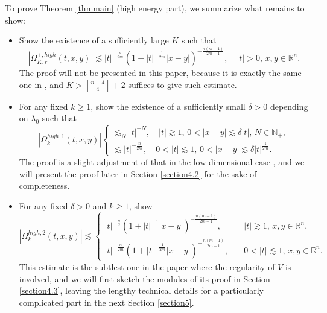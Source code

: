 \documentclass[11pt,reqno]{amsart}
\numberwithin{equation}{section}
\theoremstyle{definition}
\begin{document}
To prove Theorem \ref{thmmain} (high energy part), we summarize what remains to show:

\begin{itemize}
	\item[(\romannumeral1)] Show the existence of a sufficiently large $K$ such that
	\begin{equation*}\label{estOmegaK}
		|\Omega_{K,r}^{\pm,high}(t,x,y)|\lesssim|t|^{-\frac{n}{2m}}(1+|t|^{-\frac{1}{2m}}|x-y|)^{-\frac{n(m-1)}{2m-1}},\quad|t|>0,\,x,y\in\mathbb{R}^n.
	\end{equation*}
	The proof will not be presented in this paper, because it is exactly the same one in \cite{CHHZ}, and $K>[\frac{n-4}{4}]+2$ suffices to give such estimate.
	
	\item[(\romannumeral2)] For any fixed $k\geq1$, show the existence of a sufficiently small $\delta>0$ depending on $\lambda_0$ such that
	\begin{equation}\label{Omegahigh1}
		|\Omega_k^{high,1}(t,x,y)|\begin{cases}
			\lesssim_N|t|^{-N},\quad|t|\gtrsim1,\,0<|x-y|\lesssim\delta|t|,\,N\in\mathbb{N}_+,\\
			\lesssim|t|^{-\frac{n}{2m}},\quad0<|t|\lesssim1,\,0<|x-y|\lesssim\delta|t|^\frac{1}{2m}.
		\end{cases}
	\end{equation}
	The proof is a slight adjustment of that in the low dimensional case \cite{CHHZ}, and we will present the proof later in Section \ref{section4.2} for the sake of completeness. 

	\item[(\romannumeral3)] For any fixed $\delta>0$ and $k\geq1$, show
	\begin{equation}\label{Ogema2bound}
		|\Omega_k^{high,2}(t,x,y)|\lesssim\begin{cases}
			|t|^{-\frac{n}{2}}(1+|t|^{-1}|x-y|)^{-\frac{n(m-1)}{2m-1}},\quad&|t|\gtrsim1,\,x,y\in\mathbb{R}^n,\\
			|t|^{-\frac{n}{2m}}(1+|t|^{-\frac{1}{2m}}|x-y|)^{-\frac{n(m-1)}{2m-1}},\quad&0<|t|\lesssim1,\,x,y\in\mathbb{R}^n.
		\end{cases}
	\end{equation}
	This estimate is the subtlest one in the paper where the regularity of $V$ is involved, and we will first sketch the modules of its proof in Section \ref{section4.3}, leaving the lengthy technical details for a particularly complicated part in the next Section \ref{section5}.
\end{itemize}
\end{document}
